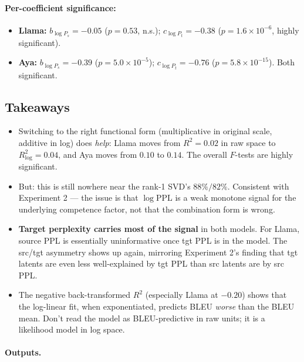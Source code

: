 \documentclass[11pt]{article}
\newcommand{\ppl}{\mathrm{PPL}}
\begin{document}
\paragraph{Per-coefficient significance:}

\begin{itemize}
  \item \textbf{Llama:} $b_{\log P_s} = -0.05$ ($p = 0.53$, n.s.); $c_{\log
    P_t} = -0.38$ ($p = 1.6\times10^{-6}$, highly significant).
  \item \textbf{Aya:} $b_{\log P_s} = -0.39$ ($p = 5.0\times10^{-5}$);
    $c_{\log P_t} = -0.76$ ($p = 5.8\times10^{-15}$). Both significant.
\end{itemize}

\subsection{Takeaways}

\begin{itemize}
  \item Switching to the right functional form (multiplicative in original
    scale, additive in log) does \emph{help}: Llama moves from $R^2 = 0.02$
    in raw space to $R^2_{\log} = 0.04$, and Aya moves from $0.10$ to
    $0.14$. The overall $F$-tests are highly significant.
  \item But: this is still nowhere near the rank-1 SVD's $88\%/82\%$.
    Consistent with Experiment 2 --- the issue is that $\log \ppl$ is a
    weak monotone signal for the underlying competence factor, not that
    the combination form is wrong.
  \item \textbf{Target perplexity carries most of the signal} in both
    models. For Llama, source PPL is essentially uninformative once tgt
    PPL is in the model. The src/tgt asymmetry shows up again, mirroring
    Experiment 2's finding that tgt latents are even less well-explained
    by tgt PPL than src latents are by src PPL.
  \item The negative back-transformed $R^2$ (especially Llama at $-0.20$)
    shows that the log-linear fit, when exponentiated, predicts BLEU
    \emph{worse} than the BLEU mean. Don't read the model as
    BLEU-predictive in raw units; it is a likelihood model in log space.
\end{itemize}

\paragraph{Outputs.}
\end{document}
